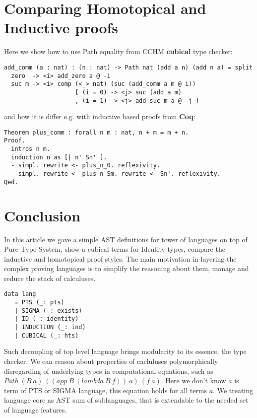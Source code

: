 \documentclass{aip-cp}
\begin{document}
\section{Comparing Homotopical and Inductive proofs}

Here we show how to use Path equality from CCHM {\bf cubical} type checker:

\begin{lstlisting}[mathescape=true]
add_comm (a : nat) : (n : nat) -> Path nat (add a n) (add n a) = split
  zero  -> <i> add_zero a @ -i
  suc m -> <i> comp (<_> nat) (suc (add_comm a m @ i))
                    [ (i = 0) -> <j> suc (add a m)
                    , (i = 1) -> <j> add_suc m a @ -j ]
\end{lstlisting}

and how it is differ e.g. with inductive based proofs from {\bf Coq}:

\begin{lstlisting}[mathescape=true]
Theorem plus_comm : forall n m : nat, n + m = m + n.
Proof.
  intros n m.
  induction n as [| n' Sn' ].
  - simpl. rewrite <- plus_n_0. reflexivity.
  - simpl. rewrite <- plus_n_Sm. rewrite <- Sn'. reflexivity.
Qed.
\end{lstlisting}

\section{Conclusion}
In this article we gave a simple AST definitions for tower of languages
on top of Pure Type System, show a cubical terms for Identity types, compare
the inductive and homotopical proof styles. The main motivation in
layering the complex proving languages is to simplify the reasoning about them,
manage and reduce the stack of calculuses.

\begin{lstlisting}[mathescape=true]
data lang
   = PTS (_: pts)
   | SIGMA (_: exists)
   | ID (_: identity)
   | INDUCTION (_: ind)
   | CUBICAL (_: hts)
\end{lstlisting}

Such decoupling of top level language brings modularity to its essence,
the type checker. We can reason about properties of cacluluses polymorphically
disregarding of underlying types in computational equations, such as
$Path\ (B\ a)\ ((app\ B\ (lambda\ B\ f))\ a)\ (f\ a)$. Here we don't know $a$ is
term of PTS or SIGMA language, this equation holds for all terms $a$.
We treating language core as AST sum of sublanguages, that is
extendable to the needed set of language features.



\newpage
\tableofcontents
\end{document}

